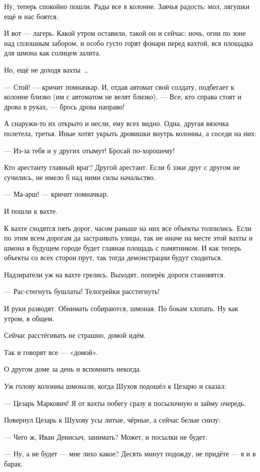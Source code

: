 Ну, теперь спокойно пошли. Рады все в колонне. Заячья радость: мол, лягушки ещё и нас боятся.

И вот --- лагерь. Какой утром оставили, такой он и сейчас: ночь, огни по зоне над сплошным забором, и особо густо горят фонари перед вахтой, вся площадка для шмона как солнцем залита.

Но, ещё не доходя вахты~\dots{}

--- Стой! --- кричит помначкар. И, отдав автомат свой солдату, подбегает к колонне близко (им с автоматом не велят близко). --- Все, кто справа стоят и дрова в руках, --- брось дрова направо!

А снаружи-то их открыто и несли, ему всех видно. Одна, другая вязочка полетела, третья. Иные хотят укрыть дровишки внутрь колонны, а соседи на них:

--- Из-за тебя и у других отымут! Бросай по-хорошему!

Кто арестанту главный враг? Другой арестант. Если б зэки друг с другом не сучились, не имело б над ними силы начальство.

--- Ма-арш! --- кричит помначкар.

И пошли к вахте.

К вахте сходятся пять дорог, часом раньше на них все объекты толпились. Если по этим всем дорогам да застраивать улицы, так не иначе на месте этой вахты и шмона в будущем городе будет главная площадь с памятником. И как теперь объекты со всех сторон прут, так тогда демонстрации будут сходиться.

Надзиратели уж на вахте грелись. Выходят, поперёк дороги становятся.

--- Рас-стегнуть бушлаты! Телогрейки расстегнуть!

И руки разводят. Обнимать собираются, шмоная. По бокам хлопать. Ну как утром, в общем.

Сейчас расстёгивать не страшно, домой идём.

Так и говорят все --- «домой».

О другом доме за день и вспомнить некогда.

Уж голову колонны шмонали, когда Шухов подошёл к Цезарю и сказал:

--- Цезарь Маркович! Я от вахты побегу сразу в посылочную и займу очередь.

Повернул Цезарь к Шухову усы литые, чёрные, а сейчас белые снизу:

--- Чего ж, Иван Денисыч, занимать? Может, и посылки не будет.

--- Ну, а не будет --- мне лихо какое? Десять минут подожду, не придёте --- я и в барак.

